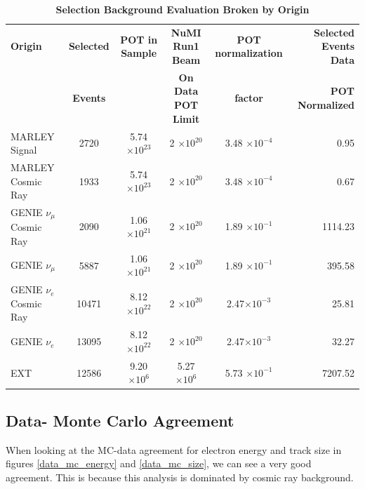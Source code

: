 \begin{table}[h!]
    \centering
    \begin{scriptsize}
	\begin{tabular}{lccccr}
		\hline
		\textbf{Origin} & \textbf{Selected}	&	\textbf{POT in Sample}	&	\textbf{NuMI Run1 Beam} & \textbf{POT normalization} & \textbf{Selected Events Data}\\
        & \textbf{Events} & & \textbf{On Data POT Limit} & \textbf{factor} & \textbf{POT Normalized}\\
		\toprule
		MARLEY Signal & 2720 & 5.74 $\times 10^{23}$ & 2 $\times 10^{20}$ & 3.48 $\times 10^{-4}$ & 0.95 \\ 
		MARLEY Cosmic Ray & 1933 & 5.74 $\times 10^{23}$ & 2 $\times 10^{20}$ & 3.48 $\times 10^{-4}$ & 0.67 \\
		GENIE  $\nu_{\mu}$ Cosmic Ray &  2090  &  1.06 $\times 10^{21}$  &  2 $\times 10^{20}$ &  1.89 $\times 10^{-1}$ & 1114.23 \\ 
        GENIE  $\nu_{\mu}$ & 5887 & 1.06 $\times 10^{21}$ & 2 $\times 10^{20}$ & 1.89 $\times 10^{-1}$ & 395.58 \\
        GENIE  $\nu_{e}$ Cosmic Ray & 10471 & 8.12 $\times 10^{22}$ & 2 $\times 10^{20}$ & 2.47$\times 10^{-3}$ & 25.81 \\
        GENIE  $\nu_{e}$ & 13095 & 8.12 $\times 10^{22}$ & 2 $\times 10^{20}$ & 2.47$\times 10^{-3}$ & 32.27 \\
        EXT & 12586 & 9.20 $\times 10^{6}$ & 5.27 $\times 10^{6}$ & 5.73 $\times 10^{-1}$ & 7207.52 \\
		\hline
	\end{tabular}
    \end{scriptsize}
	\caption[Selection Background Evaluation]{{\textbf{Selection Background Evaluation Broken by Origin}}}
    \label{bkg}
\end{table}

\newpage
\subsection{Data- Monte Carlo Agreement}
When looking at the MC-data agreement for electron energy and track size in figures \ref{data_mc_energy} and \ref{data_mc_size}, we can see a very good agreement. This is because this analysis is dominated by cosmic ray background.


